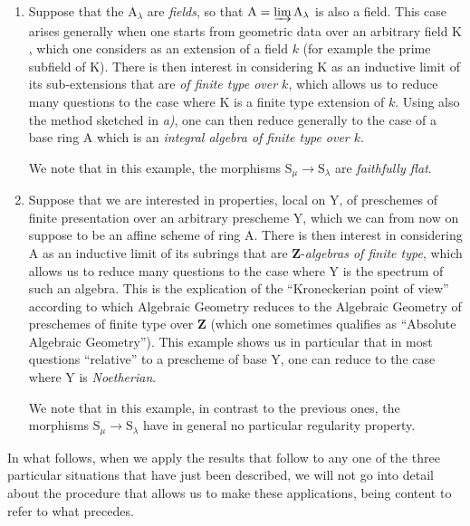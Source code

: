 \begin{env}[8.1.2]
\begin{enumerate}[label=\emph{\alph*)}]
We note that in the example considered here, the morphisms $\mathrm{S}_\mu\to\mathrm{S}_\lambda$ (for $\lambda\leqslant\mu$) are the canonical \emph{open immersions} $\mathrm{U}_\mu\hookrightarrow\mathrm{U}_\lambda$, and \emph{a fortiori} are \emph{flat} morphisms (but not faithfully flat in general), which explains the interest of the statements that appeal to such a restriction.

  \item
  Suppose that the $\mathrm{A}_\lambda$ are \emph{fields}, so that $\mathrm{A}=\varinjlim\mathrm{A}_\lambda$ is also a field.
This case arises generally when one starts from geometric data over an arbitrary field $\mathrm{K}$, which one considers as an extension of a field $k$ (for example the prime subfield of $\mathrm{K}$).
There is then interest in considering $\mathrm{K}$ as an inductive limit of its sub-extensions that are \emph{of finite type over $k$}, which allows us to reduce many questions to the case where $\mathrm{K}$ is a finite type extension of $k$.
Using also the method sketched in \emph{a)}, one can then reduce generally to the case of a base ring $\mathrm{A}$ which is an \emph{integral algebra of finite type over $k$}.

We note that in this example, the morphisms $\mathrm{S}_\mu\to\mathrm{S}_\lambda$ are \emph{faithfully flat}.

  \item
  Suppose that we are interested in properties, local on $\mathrm{Y}$, of preschemes of finite presentation over an arbitrary prescheme $\mathrm{Y}$, which we can from now on suppose to be an affine scheme of ring $\mathrm{A}$.
There is then interest in considering $\mathrm{A}$ as an inductive limit of its subrings that are $\mathbf{Z}$-\emph{algebras of finite type}, which allows us to reduce many questions to the case where $\mathrm{Y}$ is the spectrum of such an algebra.
This is the explication of the ``Kroneckerian point of view'' according to which Algebraic Geometry reduces to the
Algebraic Geometry of preschemes of finite type over $\mathbf{Z}$ (which one sometimes qualifies as ``Absolute Algebraic Geometry'').
This example shows us in particular that in most questions ``relative'' to a prescheme of base $\mathrm{Y}$, one can reduce to the case where $\mathrm{Y}$ is \emph{Noetherian}.

We note that in this example, in contrast to the previous ones, the morphisms $\mathrm{S}_\mu\to\mathrm{S}_\lambda$ have in general no particular regularity property.
\end{enumerate}

In what follows, when we apply the results that follow to any one of the three particular situations that have just been described, we will not go into detail about the procedure that allows us to make these applications, being content to refer to what precedes.
\end{env}


